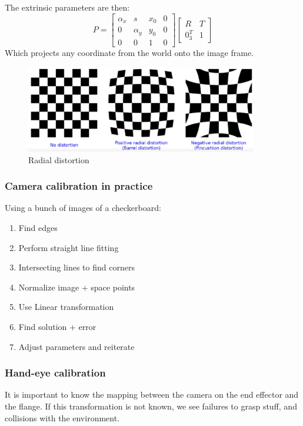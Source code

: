 \documentclass[a4paper]{article}
\begin{document}
The extrinsic parameters are then:
\begin{equation}
P = \begin{bmatrix}
\alpha_x  & s & x_0 & 0 \\
0 & \alpha_y & y_0 & 0 \\
0 & 0 & 1 & 0
\end{bmatrix} \begin{bmatrix}
R & T \\
0_3^{T}  & 1
\end{bmatrix}
\end{equation}
Which projects any coordinate from the world onto the image frame. 

\begin{figure}[H]
\centering
\includegraphics[width=0.9\textwidth]{figures/Radial_distortion.png}
\caption{Radial distortion}
\label{fig:radial_distortion}
\end{figure} 

\subsubsection*{Camera calibration in practice}
Using a bunch of images of a checkerboard:
\begin{enumerate}
	\item Find edges
	\item Perform straight line fitting
	\item Intersecting lines to find corners
	\item Normalize image + space points
	\item Use Linear transformation
	\item Find solution + error
	\item Adjust parameters and reiterate
\end{enumerate}


\subsubsection{Hand-eye calibration}
It is important to know the mapping between the camera on the end effector and the flange. If this transformation is not known, we see failures to grasp stuff, and collisions with the environment. 
\end{document}
